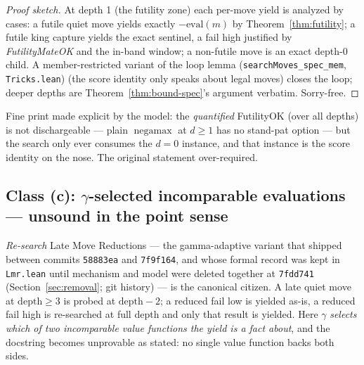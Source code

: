 \documentclass[11pt]{article}
\DeclareMathOperator{\negamax}{negamax}
\newcommand{\leanref}[2]{(\texttt{#1}, \texttt{#2})}%
\theoremstyle{plain}
\theoremstyle{definition}
\theoremstyle{remark}
\begin{document}
\begin{proof}[Proof sketch]
At depth 1 (the futility zone) each per-move yield is analyzed by cases:
a futile quiet move yields exactly $-\mathrm{eval}(m)$ by
Theorem~\ref{thm:futility}; a futile king capture yields the exact
sentinel, a fail high justified by \emph{FutilityMateOK} and the in-band
window; a non-futile move is an exact depth-0 child.  A
member-restricted variant of the loop lemma
\leanref{searchMoves\_spec\_mem}{Tricks.lean} (the score identity only
speaks about legal moves) closes the loop; deeper depths are
Theorem~\ref{thm:bound-spec}'s argument verbatim.  Sorry-free.
\end{proof}

Fine print made explicit by the model: the \emph{quantified} FutilityOK
(over all depths) is not dischargeable --- plain $\negamax$ at
$d \ge 1$ has no stand-pat option --- but the search only ever consumes
the $d = 0$ instance, and that instance is the score identity on the
nose.  The original statement over-required.

\subsection{Class (c): \texorpdfstring{$\gamma$}{gamma}-selected
incomparable evaluations --- unsound in the point sense}

\emph{Re-search} Late Move Reductions --- the gamma-adaptive variant
that shipped between commits \texttt{58883ea} and \texttt{7f9f164}, and
whose formal record was kept in \texttt{Lmr.lean} until mechanism and
model were deleted together at \texttt{7fdd741}
(Section~\ref{sec:removal}; git history) --- is the canonical
citizen.  A late quiet move at $\mathrm{depth} \ge 3$ is probed at
$\mathrm{depth}-2$; a reduced fail low is yielded as-is, a reduced fail
high is re-searched at full depth and only that result is yielded.  Here $\gamma$ \emph{selects which of
two incomparable value functions the yield is a fact about}, and the
docstring becomes unprovable as stated: no single value function backs
both sides.
\end{document}
